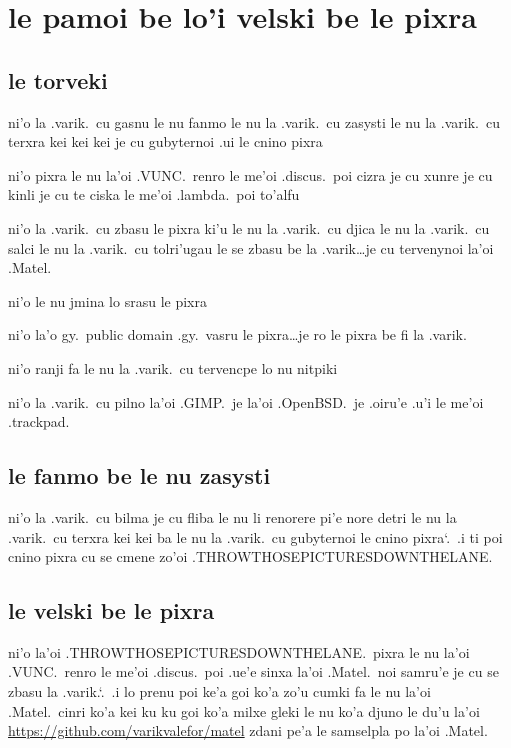 \documentclass{report}
\newcommand\sds{\spacefactor\sfcode`.\ \space}
\begin{document}
\section{le pamoi be lo'i velski be le pixra}
\subsection{le torveki}
ni'o la .varik.\ cu gasnu le nu fanmo le nu la .varik.\ cu zasysti le nu la .varik.\ cu terxra kei kei kei je cu gubyternoi .ui le cnino pixra

ni'o pixra le nu la'oi .VUNC.\ renro le me'oi .discus.\ poi cizra je cu xunre je cu kinli je cu te ciska le me'oi .lambda.\ poi to'alfu

ni'o la .varik.\ cu zbasu le pixra ki'u le nu la .varik.\ cu djica le nu la .varik.\ cu salci le nu la .varik.\ cu tolri'ugau le se zbasu be la .varik\ldots je cu tervenynoi la'oi .Matel.

ni'o le nu jmina lo srasu le pixra

ni'o la'o gy.\ public domain .gy.\ vasru le pixra\ldots je ro le pixra be fi la .varik.

ni'o ranji fa le nu la .varik.\ cu tervencpe lo nu nitpiki

ni'o la .varik.\ cu pilno la'oi .GIMP.\ je la'oi .OpenBSD.\ je .oiru'e .u'i le me'oi .trackpad.

\subsection{le fanmo be le nu zasysti}
ni'o la .varik.\ cu bilma je cu fliba le nu li renorere pi'e nore detri le nu la .varik.\ cu terxra kei kei ba le nu la .varik.\ cu gubyternoi le cnino pixra\sds  .i ti poi cnino pixra cu se cmene zo'oi .THROWTHOSEPICTURESDOWNTHELANE.

\subsection{le velski be le pixra}
ni'o la'oi .THROWTHOSEPICTURESDOWNTHELANE.\ pixra le nu la'oi \linebreak  %
.VUNC.\ renro le me'oi .discus.\ poi .ue'e sinxa la'oi .Matel.\ noi samru'e je cu se zbasu la .varik.\sds  .i lo prenu poi ke'a goi ko'a zo'u cumki fa le nu la'oi .Matel.\ cinri ko'a kei ku ku goi ko'a milxe gleki le nu ko'a djuno le du'u la'oi \url{https://github.com/varikvalefor/matel} zdani pe'a le samselpla po la'oi .Matel.
\end{document}
